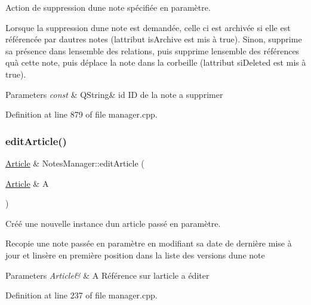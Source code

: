 Action de suppression d\textquotesingle{}une note spécifiée en paramètre. 

Lorsque la suppression d\textquotesingle{}une note est demandée, celle ci est archivée si elle est référencée par d\textquotesingle{}autres notes (l\textquotesingle{}attribut is\+Archive est mis à true). Sinon, supprime sa présence dans l\textquotesingle{}ensemble des relations, puis supprime l\textquotesingle{}ensemble des références qu\textquotesingle{}à cette note, puis déplace la note dans la corbeille (l\textquotesingle{}attribut si\+Deleted est mis à true). 
\begin{DoxyParams}{Parameters}
{\em const} & Q\+String\& id ID de la note a supprimer \\
\hline
\end{DoxyParams}


Definition at line 879 of file manager.\+cpp.

\mbox{\label{class_notes_manager_a3259c7aa22b5f2eee6f7bceddc707b1d}} 
\subsubsection{\texorpdfstring{edit\+Article()}{editArticle()}}
{\footnotesize\ttfamily \hyperlink{class_article}{Article} \& Notes\+Manager\+::edit\+Article (\begin{DoxyParamCaption}\item[{\hyperlink{class_article}{Article} \&}]{A }\end{DoxyParamCaption})}



Créé une nouvelle instance d\textquotesingle{}un article passé en paramètre. 

Recopie une note passée en paramètre en modifiant sa date de dernière mise à jour et l\textquotesingle{}insère en première position dans la liste des versions d\textquotesingle{}une note 
\begin{DoxyParams}{Parameters}
{\em Article\&} & A Référence sur l\textquotesingle{}article a éditer \\
\hline
\end{DoxyParams}


Definition at line 237 of file manager.\+cpp.

\mbox{\label{class_notes_manager_a1c4cfa021a12b6416c4e800d643b5e0a}} 
